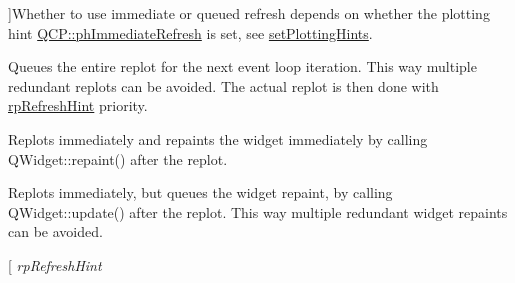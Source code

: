 \begin{Desc}
\begin{description}
{}]Whether to use immediate or queued refresh depends on whether the plotting hint \hyperlink{namespace_q_c_p_a5400e5fcb9528d92002ddb938c1f4ef4acf4738ba3f53c15dd1ad297f512b813e}{Q\+C\+P\+::ph\+Immediate\+Refresh} is set, see \hyperlink{class_q_custom_plot_a94a33cbdadbbac5934843508bcfc210d}{set\+Plotting\+Hints}. \item[{\em 
rp\+Queued\+Replot\hypertarget{class_q_custom_plot_a45d61392d13042e712a956d27762aa39a074ea69d5b4756518e334e71a0ba4ad4}{}\label{class_q_custom_plot_a45d61392d13042e712a956d27762aa39a074ea69d5b4756518e334e71a0ba4ad4}
}]Queues the entire replot for the next event loop iteration. This way multiple redundant replots can be avoided. The actual replot is then done with \hyperlink{class_q_custom_plot_a45d61392d13042e712a956d27762aa39a5349b4ed6366760e34653bc54613a5ad}{rp\+Refresh\+Hint} priority. \item[{\em 
rp\+Immediate\+Refresh\hypertarget{class_q_custom_plot_a45d61392d13042e712a956d27762aa39ae0655eb7caba1996004d27939970af2c}{}\label{class_q_custom_plot_a45d61392d13042e712a956d27762aa39ae0655eb7caba1996004d27939970af2c}
}]Replots immediately and repaints the widget immediately by calling Q\+Widget\+::repaint() after the replot. \item[{\em 
rp\+Queued\+Refresh\hypertarget{class_q_custom_plot_a45d61392d13042e712a956d27762aa39ae51e73bce42e9d76081f2266bb429acb}{}\label{class_q_custom_plot_a45d61392d13042e712a956d27762aa39ae51e73bce42e9d76081f2266bb429acb}
}]Replots immediately, but queues the widget repaint, by calling Q\+Widget\+::update() after the replot. This way multiple redundant widget repaints can be avoided. \item[{\em 
rp\+Refresh\+Hint\hypertarget{class_q_custom_plot_a45d61392d13042e712a956d27762aa39a5349b4ed6366760e34653bc54613a5ad}{}\label{class_q_custom_plot_a45d61392d13042e712a956d27762aa39a5349b4ed6366760e34653bc54613a5ad}
}
\end{description}
\end{Desc}
